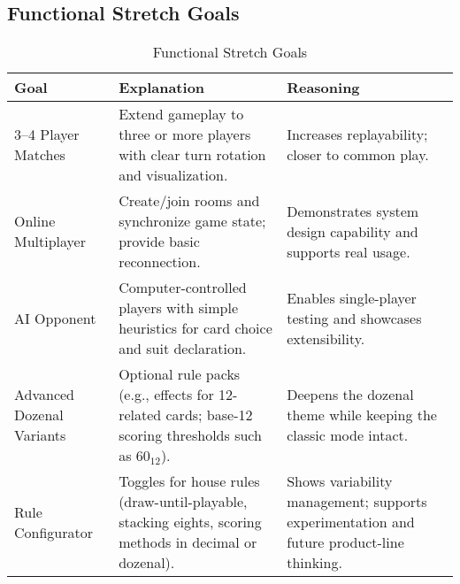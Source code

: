 \documentclass{article}
\begin{document}
    \subsection{Functional Stretch Goals}
    \begin{table}[H]
        \caption{Functional Stretch Goals}\label{TblStretchFunctionalGoals}
        \begin{tabular}{|p{}|p{}|p{}|}
            \hline
            \textbf{Goal} & \textbf{Explanation} & \textbf{Reasoning} \\
            \hline
            3--4 Player Matches &
            Extend gameplay to three or more players with clear turn rotation and visualization. &
            Increases replayability; closer to common play. \\
            \hline
            Online Multiplayer &
            Create/join rooms and synchronize game state; provide basic reconnection. &
            Demonstrates system design capability and supports real usage. \\
            \hline
            AI Opponent &
            Computer-controlled players with simple heuristics for card choice and suit declaration. &
            Enables single-player testing and showcases extensibility. \\
            \hline
            Advanced Dozenal Variants &
            Optional rule packs (e.g., effects for 12-related cards; base-12 scoring thresholds such as \(60_{12}\)). &
            Deepens the dozenal theme while keeping the classic mode intact. \\
            \hline
            Rule Configurator &
            Toggles for house rules (draw-until-playable, stacking eights, scoring methods in decimal or dozenal). &
            Shows variability management; supports experimentation and future product-line thinking. \\
            \hline
        \end{tabular}
    \end{table}
\end{document}
